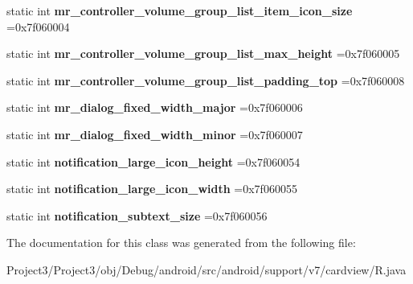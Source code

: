 \begin{DoxyCompactItemize}
static int {\bfseries mr\+\_\+controller\+\_\+volume\+\_\+group\+\_\+list\+\_\+item\+\_\+icon\+\_\+size} =0x7f060004
\item 
\mbox{\label{classandroid_1_1support_1_1v7_1_1cardview_1_1R_1_1dimen_af32d3fad9fcdc59241e030a407aaec93}} 
static int {\bfseries mr\+\_\+controller\+\_\+volume\+\_\+group\+\_\+list\+\_\+max\+\_\+height} =0x7f060005
\item 
\mbox{\label{classandroid_1_1support_1_1v7_1_1cardview_1_1R_1_1dimen_a84d37f915b5b0818c4549762a9d16864}} 
static int {\bfseries mr\+\_\+controller\+\_\+volume\+\_\+group\+\_\+list\+\_\+padding\+\_\+top} =0x7f060008
\item 
\mbox{\label{classandroid_1_1support_1_1v7_1_1cardview_1_1R_1_1dimen_aa26aafd47aa5aeb87e32a64b7948cbaa}} 
static int {\bfseries mr\+\_\+dialog\+\_\+fixed\+\_\+width\+\_\+major} =0x7f060006
\item 
\mbox{\label{classandroid_1_1support_1_1v7_1_1cardview_1_1R_1_1dimen_a15b6b22e58fc93220847ec0d053a0f9c}} 
static int {\bfseries mr\+\_\+dialog\+\_\+fixed\+\_\+width\+\_\+minor} =0x7f060007
\item 
\mbox{\label{classandroid_1_1support_1_1v7_1_1cardview_1_1R_1_1dimen_a1577f9862ea03c939c32bf12b6e92ab4}} 
static int {\bfseries notification\+\_\+large\+\_\+icon\+\_\+height} =0x7f060054
\item 
\mbox{\label{classandroid_1_1support_1_1v7_1_1cardview_1_1R_1_1dimen_a95fce7ef69dd2455d8429bbe5d49fa3e}} 
static int {\bfseries notification\+\_\+large\+\_\+icon\+\_\+width} =0x7f060055
\item 
\mbox{\label{classandroid_1_1support_1_1v7_1_1cardview_1_1R_1_1dimen_a7f8a79d96446494a66aa4e80b64acbda}} 
static int {\bfseries notification\+\_\+subtext\+\_\+size} =0x7f060056
\end{DoxyCompactItemize}


The documentation for this class was generated from the following file\+:\begin{DoxyCompactItemize}
\item 
Project3/\+Project3/obj/\+Debug/android/src/android/support/v7/cardview/R.\+java\end{DoxyCompactItemize}
